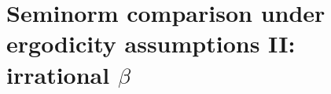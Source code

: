 \documentclass[11pt]{amsart}
\newtheorem{corollary}[lemma]{Corollary}
\theoremstyle{definition}
\newcommand{\R}{{\mathbb R}}
\newcommand{\nnorm}[1]{\lvert\!|\!| #1|\!|\!\rvert}
\newcommand{\1}{{\mathbf{1}}}
\newcommand{\floor}[1]{{\left \lfloor #1 \right \rfloor}}
\begin{document}


\section{Seminorm comparison under ergodicity assumptions II: irrational $\beta$}\label{S: seminorm comparison II}
\end{document}
